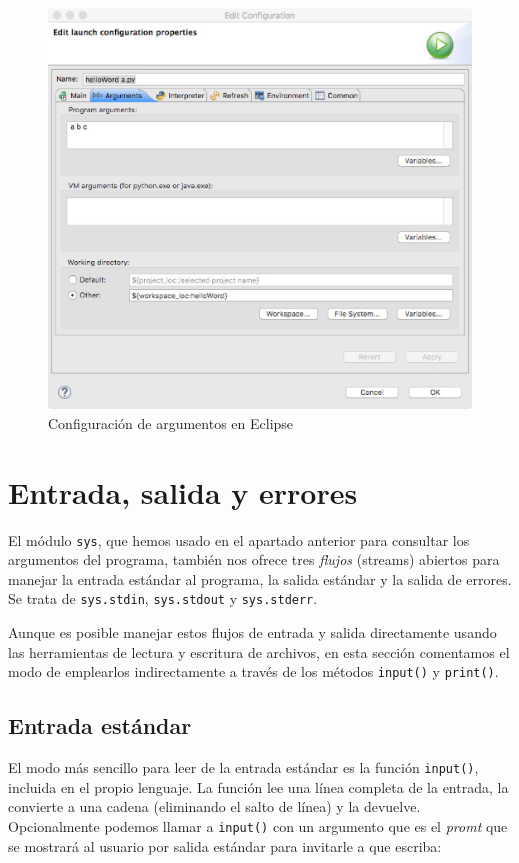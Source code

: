 \begin{figure}
\begin{center}
\includegraphics[height=0.65\textwidth]{imagenes/arguments}
\end{center}
\caption{Configuración de argumentos en Eclipse}
\label{fig:argumentos}
\end{figure}

\section{Entrada, salida y errores}

El módulo \texttt{sys}, que hemos usado en el apartado anterior para consultar los argumentos del programa, también nos ofrece tres \emph{flujos} (streams) abiertos para manejar la entrada estándar al programa, la salida estándar y la salida de errores. Se trata de \texttt{sys.stdin}, \texttt{sys.stdout} y \texttt{sys.stderr}. 

Aunque es posible manejar estos flujos de entrada y salida directamente usando las herramientas de lectura y escritura de archivos, en esta sección comentamos el modo de emplearlos indirectamente a través de los métodos \texttt{input()} y \texttt{print()}.

\subsection{Entrada estándar}

El modo más sencillo para leer de la entrada estándar es la función \texttt{input()}, incluida en el propio lenguaje. La función lee una línea completa de la entrada, la convierte a una cadena (eliminando el salto de línea) y la devuelve. Opcionalmente podemos llamar a \texttt{input()} con un argumento que es el \emph{promt} que se mostrará al usuario por salida estándar para invitarle a que escriba:

